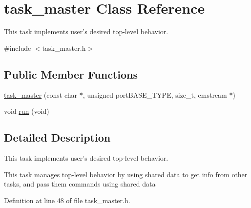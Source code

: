 \hypertarget{classtask__master}{\section{task\-\_\-master \-Class \-Reference}
\label{classtask__master}
}


\-This task implements user's desired top-\/level behavior.  




{\ttfamily \#include $<$task\-\_\-master.\-h$>$}

\subsection*{\-Public \-Member \-Functions}
\begin{DoxyCompactItemize}
\item 
\hyperlink{classtask__master_aad5a36ec211ee2f688f024bd09274acc}{task\-\_\-master} (const char $\ast$, unsigned port\-B\-A\-S\-E\-\_\-\-T\-Y\-P\-E, size\-\_\-t, emstream $\ast$)
\item 
void \hyperlink{classtask__master_aff6e03d8430ddfb412d1258c11d93f87}{run} (void)
\end{DoxyCompactItemize}


\subsection{\-Detailed \-Description}
\-This task implements user's desired top-\/level behavior. 

\-This task manages top-\/level behavior by using shared data to get info from other tasks, and pass them commands using shared data 

\-Definition at line 48 of file task\-\_\-master.\-h.



